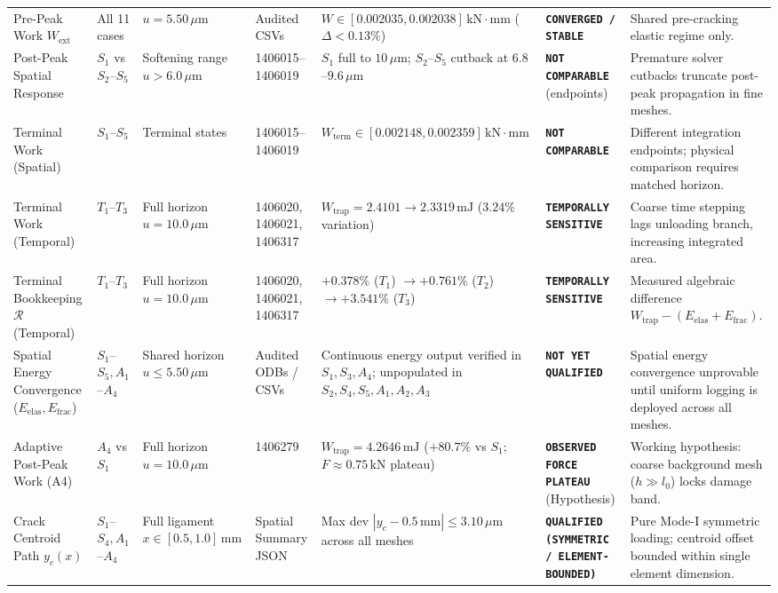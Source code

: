 \begin{table}[htbp]
\begin{tabularx}{\textwidth}{p{2.2cm}p{1.4cm}p{1.8cm}p{1.7cm}p{2.3cm}p{1.8cm}X}
Pre-Peak Work $W_{\mathrm{ext}}$ & All 11 cases & $u = 5.50\,\mu\mathrm{m}$ & Audited CSVs & $W \in [0.002035, 0.002038]\,\mathrm{kN\cdot mm}$ ($\Delta < 0.13\%$) & \textbf{\texttt{CONVERGED / STABLE}} & Shared pre-cracking elastic regime only. \\
Post-Peak Spatial Response & $S_1$ vs $S_2$--$S_5$ & Softening range $u > 6.0\,\mu\mathrm{m}$ & 1406015--1406019 & $S_1$ full to $10\,\mu\mathrm{m}$; $S_2$--$S_5$ cutback at $6.8$--$9.6\,\mu\mathrm{m}$ & \textbf{\texttt{NOT COMPARABLE}} (endpoints) & Premature solver cutbacks truncate post-peak propagation in fine meshes. \\
Terminal Work (Spatial) & $S_1$--$S_5$ & Terminal states & 1406015--1406019 & $W_{\mathrm{term}} \in [0.002148, 0.002359]\,\mathrm{kN\cdot mm}$ & \textbf{\texttt{NOT COMPARABLE}} & Different integration endpoints; physical comparison requires matched horizon. \\
Terminal Work (Temporal) & $T_1$--$T_3$ & Full horizon $u = 10.0\,\mu\mathrm{m}$ & 1406020, 1406021, 1406317 & $W_{\mathrm{trap}} = 2.4101 \to 2.3319\,\mathrm{mJ}$ ($3.24\%$ variation) & \textbf{\texttt{TEMPORALLY SENSITIVE}} & Coarse time stepping lags unloading branch, increasing integrated area. \\
Terminal Bookkeeping $\mathcal{R}$ (Temporal) & $T_1$--$T_3$ & Full horizon $u = 10.0\,\mu\mathrm{m}$ & 1406020, 1406021, 1406317 & $+0.378\%$ ($T_1$) $\to +0.761\%$ ($T_2$) $\to +3.541\%$ ($T_3$) & \textbf{\texttt{TEMPORALLY SENSITIVE}} & Measured algebraic difference $W_{\mathrm{trap}} - (E_{\mathrm{elas}} + E_{\mathrm{frac}})$. \\
Spatial Energy Convergence ($E_{\mathrm{elas}}, E_{\mathrm{frac}}$) & $S_1$--$S_5, A_1$--$A_4$ & Shared horizon $u \le 5.50\,\mu\mathrm{m}$ & Audited ODBs / CSVs & Continuous energy output verified in $S_1, S_3, A_4$; unpopulated in $S_2, S_4, S_5, A_1, A_2, A_3$ & \textbf{\texttt{NOT YET QUALIFIED}} & Spatial energy convergence unprovable until uniform logging is deployed across all meshes. \\
Adaptive Post-Peak Work (A4) & $A_4$ vs $S_1$ & Full horizon $u = 10.0\,\mu\mathrm{m}$ & 1406279 & $W_{\mathrm{trap}} = 4.2646\,\mathrm{mJ}$ ($+80.7\%$ vs $S_1$; $F \approx 0.75\,\mathrm{kN}$ plateau) & \textbf{\texttt{OBSERVED FORCE PLATEAU}} (Hypothesis) & Working hypothesis: coarse background mesh ($h \gg l_0$) locks damage band. \\
Crack Centroid Path $y_c(x)$ & $S_1$--$S_4, A_1$--$A_4$ & Full ligament $x \in [0.5, 1.0]\,\mathrm{mm}$ & Spatial Summary JSON & Max dev $|y_c - 0.5\,\mathrm{mm}| \le 3.10\,\mu\mathrm{m}$ across all meshes & \textbf{\texttt{QUALIFIED (SYMMETRIC / ELEMENT-BOUNDED)}} & Pure Mode-I symmetric loading; centroid offset bounded within single element dimension. \\

\end{tabularx}
\end{table}

